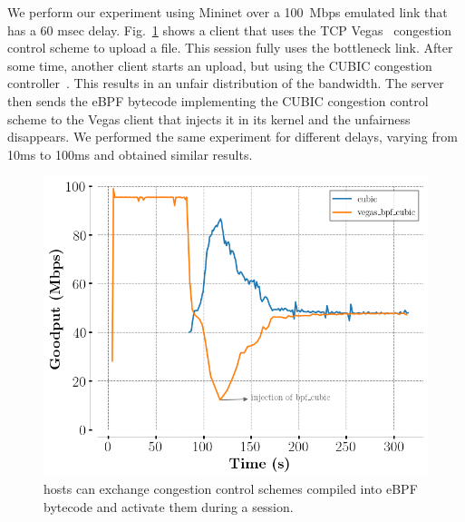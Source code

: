 We perform our experiment using Mininet over a 100~Mbps emulated link
that has a 60 msec delay.
Fig.~\ref{fig:vegasCubic} shows a client that uses the TCP
Vegas~\cite{10.1145/190314.190317} congestion control scheme to upload a file.
This \tcpls session fully uses the bottleneck link. After some time, another
client starts an upload, but using the CUBIC congestion
controller~\cite{rfc8312}. This results in an unfair distribution of the
bandwidth. The server then sends the eBPF bytecode implementing the CUBIC congestion
control scheme to the \tcp Vegas client that injects it in its kernel and the
unfairness disappears. We performed the same experiment for different delays,
varying from 10ms to 100ms and obtained similar results.

\begin{figure}[!t]
  \begin{center}
    \includegraphics[width=.8\columnwidth]{pretty_plotify/plots/vegas_cubic.png}
  \end{center}
\vspace{-0.5cm}
  \caption{\tcpls hosts can exchange congestion control schemes compiled into eBPF bytecode and activate them during a \tcpls session.}
  \label{fig:vegasCubic}
\end{figure}
